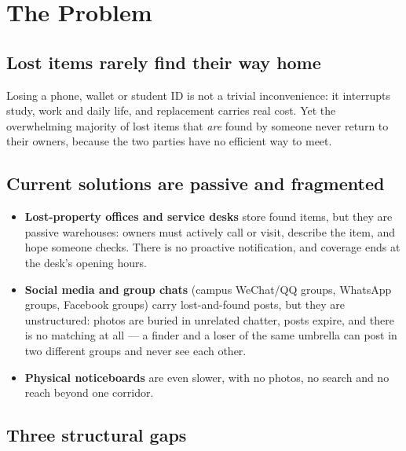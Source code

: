 \documentclass[11pt,a4paper]{article}
\begin{document}
\section{The Problem}

\subsection{Lost items rarely find their way home}

Losing a phone, wallet or student ID is not a trivial inconvenience: it interrupts study,
work and daily life, and replacement carries real cost. Yet the overwhelming majority of
lost items that \emph{are} found by someone never return to their owners, because the two
parties have no efficient way to meet.

\subsection{Current solutions are passive and fragmented}

\begin{itemize}
  \item \textbf{Lost-property offices and service desks} store found items, but they are
        passive warehouses: owners must actively call or visit, describe the item, and hope
        someone checks. There is no proactive notification, and coverage ends at the desk's
        opening hours.
  \item \textbf{Social media and group chats} (campus WeChat/QQ groups, WhatsApp groups,
        Facebook groups) carry lost-and-found posts, but they are unstructured: photos are
        buried in unrelated chatter, posts expire, and there is no matching at all --- a
        finder and a loser of the same umbrella can post in two different groups and never
        see each other.
  \item \textbf{Physical noticeboards} are even slower, with no photos, no search and no
        reach beyond one corridor.
\end{itemize}

\subsection{Three structural gaps}
\end{document}
